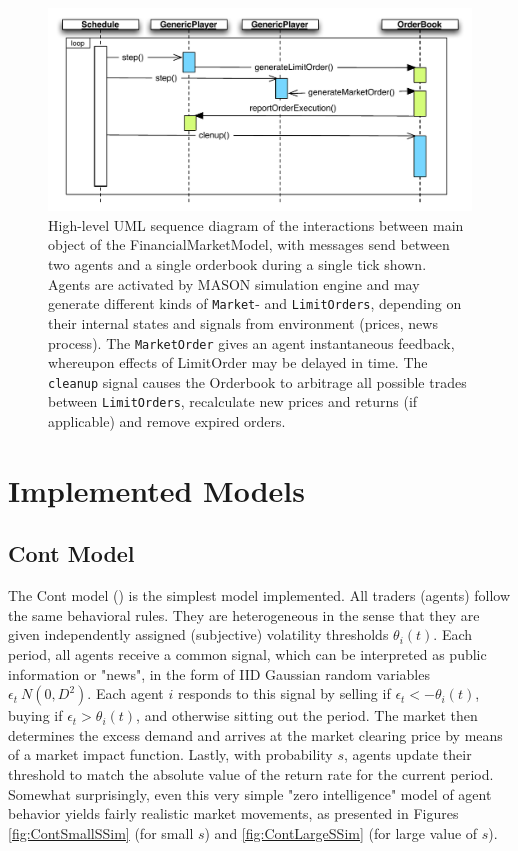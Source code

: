 \documentclass[runningheads]{llncs}
\begin{document}
\begin{figure}[htb]
\centering
\includegraphics[width=1.0\textwidth]{../graphics/masterSequenceDiagram.pdf}
\caption{High-level UML sequence diagram of the interactions between main object of the FinancialMarketModel, with messages send between two agents and a single orderbook during a single tick shown. Agents are activated by MASON simulation engine and may generate different kinds of \texttt{Market}- and \texttt{LimitOrders}, depending on their internal states and signals from environment (prices, news process). The \texttt{MarketOrder} gives an agent instantaneous feedback, whereupon effects of LimitOrder may be delayed in time. The \texttt{cleanup} signal causes the Orderbook to arbitrage all possible trades between \texttt{LimitOrders}, recalculate new prices and returns (if applicable) and remove expired orders.}
\label{fig:general_sequence}
\end{figure}


\section{Implemented Models}

\subsection{Cont Model}

The Cont model (\cite{cont2006}) is the simplest model implemented. All traders (agents) follow the same behavioral rules. They are heterogeneous in the sense that they are given independently assigned (subjective) volatility thresholds $\theta_i(t)$. Each period, all agents receive a common signal, which can be interpreted as public information or "news", in the form of IID Gaussian random variables $\epsilon_t ~ N(0,D^2)$. Each agent $i$ responds to this signal by selling if $\epsilon_t < -\theta_i(t)$, buying if $\epsilon_t > \theta_i(t)$, and otherwise sitting out the period. The market then determines the excess demand and arrives at the market clearing price by means of a market impact function. Lastly, with probability $s$, agents update their threshold to match the absolute value of the return rate for the current period. Somewhat surprisingly, even this very simple "zero intelligence" model of agent behavior yields fairly realistic market movements, as presented in Figures \ref{fig:ContSmallSSim} (for small $s$) and \ref{fig:ContLargeSSim} (for large value of $s$). 
\end{document}
